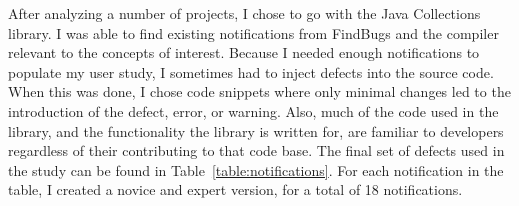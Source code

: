 After analyzing a number of projects, I chose to go with the Java Collections library. I was able to find existing notifications from FindBugs and the compiler relevant to the concepts of interest. Because I needed enough notifications to populate my user study, I sometimes had to inject defects into the source code. When this was done, I chose code snippets where only minimal changes led to the introduction of the defect, error, or warning. Also, much of the code used in the library, and the functionality the library is written for, are familiar to developers regardless of their contributing to that code base.
The final set of defects used in the study can be found in Table~\ref{table:notifications}. For each notification in the table, I created a novice and expert version, for a total of 18 notifications.


